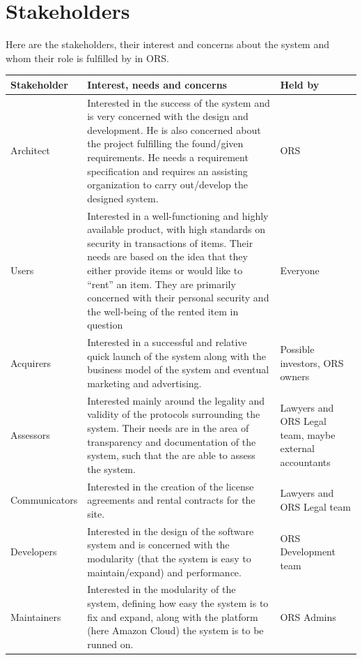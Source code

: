 \documentclass[a4paper,11pt]{report}
\begin{document}
\section{Stakeholders}
\label{sec:stakeholders}
Here are the stakeholders, their interest and concerns about the system and whom their role is fulfilled by in ORS.
\begin{center}
    \begin{longtable}[H]{| l |  p{6cm} | p{2cm} |}
    \hline
    \textbf{Stakeholder} & \textbf{Interest, needs and concerns} & \textbf{Held
        by} \\
    \hline
    Architect & Interested in the success of the system and is very concerned
        with the design and development. He is also concerned about the project 
        fulfilling the found/given requirements. He needs a requirement
        specification and requires an assisting organization to carry
        out/develop the designed system. & ORS \\
    \hline
    Users &  Interested in a well-functioning and highly available product,
        with high standards on security in transactions of items. Their needs
        are based on the idea that they either provide items or would like to
        ``rent'' an item. They are primarily concerned with their personal
        security and the well-being of the rented item in question & Everyone \\
    \hline
    Acquirers & Interested in a successful and relative quick launch of the system along with the business model of the system and eventual marketing and advertising. & Possible investors, ORS owners \\
    \hline
    Assessors & Interested mainly around the legality and validity of the
        protocols surrounding the system. Their needs are in the area of
        transparency and documentation of the system, such that the are able to
        assess the system. & Lawyers and ORS Legal team, maybe external
        accountants\\
    \hline
    Communicators & Interested in the creation of the license agreements and rental contracts for the site. & Lawyers and ORS Legal team\\
    \hline
    Developers & Interested in the design of the software system and is concerned with the modularity (that the system is easy to maintain/expand) and performance. & ORS Development team\\
    \hline
    Maintainers & Interested in the modularity of the system, defining how easy the system is to fix and expand, along with the platform (here Amazon Cloud) the system is to be runned on. & ORS Admins \\

\end{longtable}
\end{center}
\end{document}
